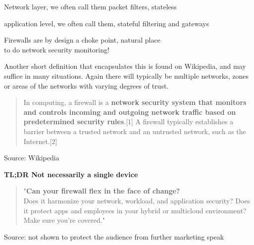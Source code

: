 \documentclass[Screen16to9,17pt]{foils}
\begin{document}
\begin{list2}
\item Network layer, we often call them packet filters, stateless
\item application level, we often call them, stateful filtering and gateways
\item Firewalls are by design a choke point, natural place \\
to do network security monitoring!
\end{list2}



Another short definition that encapsulates this is found on Wikipedia, and may suffice in many situations. Again there will typically be multiple networks, zones or areas of the networks with varying degrees of trust.
\begin{quote}
In computing, a firewall is a {\bf network security system that monitors and controls incoming and outgoing network traffic based on predetermined security rules}.[1] A firewall typically establishes a barrier between a trusted network and an untrusted network, such as the Internet.[2]
\end{quote}
Source: Wikipedia

{\bf TL;DR Not necessarily a single device}




\begin{quote}
"{\bf Can your firewall flex in the face of change?}\\
Does it harmonize your network, workload, and application security? Does it protect apps and employees in your hybrid or multicloud environment? Make sure you're covered."
\end{quote}
Source: not shown to protect the audience from further marketing speak


\end{document}
